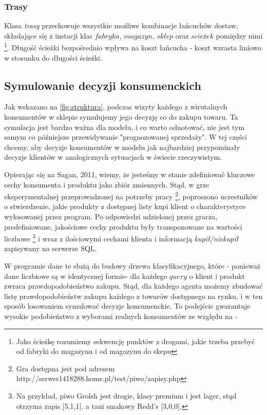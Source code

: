\documentclass{article}
\begin{document}
\subsubsection{Trasy}

Klasa \textit{trasy} przechowuje wszystkie możliwe kombinacje łańcuchów dostaw, składające się z instacji klas $fabryka$, $magazyn$, $sklep$ oraz $scieżek$ pomiędzy nimi \footnote{Jako ścieżkę rozumiemy sekwencję punktów z drogami, jakie trzeba przebyć od fabryki do magazynu i od magazynu do skepu}. Długość ścieżki bezpośrednio wpływa na koszt łańcucha - koszt wzrasta liniowo w stosunku do długości ścieżki.

\subsection{Symulowanie decyzji konsumenckich}

Jak wskazano na \ref{fig:struktura}, podczas wizyty każdego z wirutalnych konsumentów w sklepie symulujemy jego decyzję co do zakupu towaru. Ta symulacja jest bardzo ważna dla modelu, i co warto odnotować, nie jest tym samym co późniejsze przewidywanie "prognozowanej sprzedaży". W tej części chcemy, aby decyzje konsumentów w modelu jak najbardziej przypominały decyzje klientów w analogicznych sytuacjach w świecie rzeczywistym. 

Opierając się na Sagan, 2011, wiemy, że jesteśmy w stanie zdefiniować kluczowe cechy konsumenta i produktu jako zbiór zmiennych. Stąd, w grze eksperymentalnej przeprowadzonej na potrzeby pracy \footnote{Gra dostępna jest pod adresem http://serwer1418288.home.pl/test/piwo/zapisy.php}, poproszono uczestników o stwierdzenie, jakie produkty z dostępnej listy kupi klient o charakterystyce wylosowanej przez program. Po odpowiedzi udzielonej przez gracza, predefiniowane, jakościowe cechy produktu były transponowane na wartości liczbowe \footnote{Na przykład, piwo Grolsh jest drogie, klasy premium i jest lager, stąd otrzyma zapis [5,1,1], a tani smakowy Redd's [3,0,0].} i wraz z ilościowymi cechami klienta i informacją \textit{kupił/niekupił} zapisywany na serwerze SQL. 

W programie dane te służą do budowy drzewa klasyfikacyjnego, które - ponieważ dane liczbiowe są w identycznej formie- dla każdego $query$ o klient i produkt zwraca prawdopodobieństwo zakupu. Stąd, dla każdego agenta możemy zbudować listę prawdopodobieństw zakupu każdego z towarów dostępnego na rynku, i w ten sposób losowaniem symulować decyzje konsumenckie. To podejście gwarantuje wysokie podobieństwo z wyborami realnych konsumentów ze względu na - 
\end{document}
